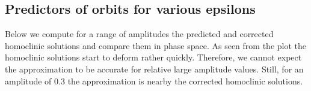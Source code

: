 \documentclass[letterpaper,10pt,english]{jupyterBook}
\begin{document}
\begin{sphinxVerbatim}[commandchars=\\\{\}]
\PYG{p}{[}\PYG{p}{]}
\end{sphinxVerbatim}

\noindent{}


\subsection{Predictors of orbits for various epsilons}
\label{\detokenize{extendedLorenz84model:predictors-of-orbits-for-various-epsilons}}
\sphinxAtStartPar
Below we compute for a range of amplitudes the predicted and corrected
homoclinic solutions and compare them in phase space. As seen from the plot
{\hyperref[\detokenize{extendedLorenz84model:lorenz-continued-homoclinic-solutions-phase-space}]{}} the homoclinic
solutions start to deform rather quickly. Therefore, we cannot expect the
approximation to be accurate for relative large amplitude values. Still, for
an amplitude of \(0.3\) the approximation is nearby the corrected homoclinic
solutions.
\end{document}
